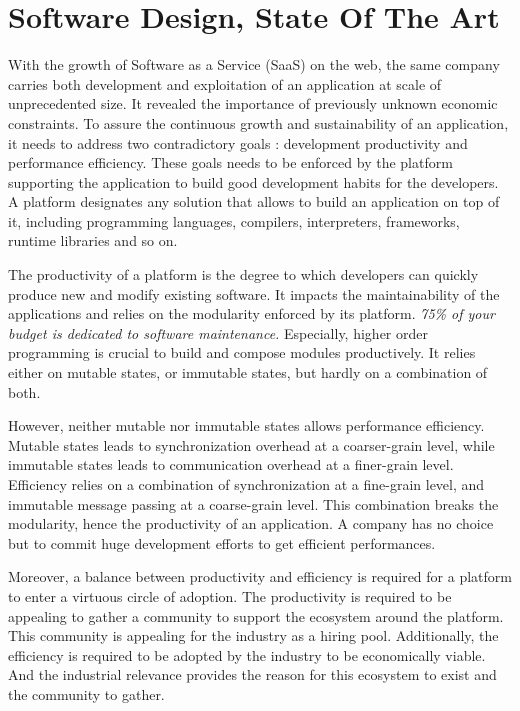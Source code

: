 \chapter{Software Design, State Of The Art} \label{chapter3}
\minitoc
\eject


With the growth of Software as a Service (SaaS) on the web, the same company carries both development and exploitation of an application at scale of unprecedented size.
It revealed the importance of previously unknown economic constraints.
To assure the continuous growth and sustainability of an application, it needs to address two contradictory goals : development productivity and performance efficiency.
These goals needs to be enforced by the platform supporting the application to build good development habits for the developers.
A platform designates any solution that allows to build an application on top of it, including programming languages, compilers, interpreters, frameworks, runtime libraries and so on.

The productivity of a platform is the degree to which developers can quickly produce new and modify existing software.
It impacts the maintainability of the applications and relies on the modularity enforced by its platform.
\textit{75\% of your budget is dedicated to software maintenance.}
Especially, higher order programming is crucial to build and compose modules productively.
It relies either on mutable states, or immutable states, but hardly on a combination of both.

However, neither mutable nor immutable states allows performance efficiency.
Mutable states leads to synchronization overhead at a coarser-grain level, while immutable states leads to communication overhead at a finer-grain level.
Efficiency relies on a combination of synchronization at a fine-grain level, and immutable message passing at a coarse-grain level.
This combination breaks the modularity, hence the productivity of an application.
A company has no choice but to commit huge development efforts to get efficient performances.

Moreover, a balance between productivity and efficiency is required for a platform to enter a virtuous circle of adoption.
The productivity is required to be appealing to gather a community to support the ecosystem around the platform.
This community is appealing for the industry as a hiring pool.
Additionally, the efficiency is required to be adopted by the industry to be economically viable.
And the industrial relevance provides the reason for this ecosystem to exist and the community to gather.

